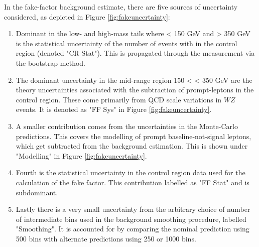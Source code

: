 In the fake-factor background estimate, there are five sources of uncertainty considered, as depicted in Figure \ref{fig:fakeuncertainty}: 
\begin{enumerate}
    \item Dominant in the low- and high-mass tails where \mFourL < 150 GeV and \mFourL > 350 GeV is the statistical uncertainty of the number of events with in the control region (denoted "CR Stat"). This is propagated through the measurement via the bootstrap method.
    \item The dominant uncertainty in the mid-range region 150 < \mFourL < 350 GeV are the theory uncertainties associated with the subtraction of prompt-leptons in the control region. These come primarily from QCD scale variations in $WZ$ events. It is denoted as "FF Sys" in Figure \ref{fig:fakeuncertainty}. 
    \item A smaller contribution comes from the uncertainties in the Monte-Carlo predictions. This covers the modelling of prompt baseline-not-signal leptons, which get subtracted from the background estimation. This is shown under "Modelling" in Figure \ref{fig:fakeuncertainty}. 
    \item Fourth is the statistical uncertainty in the control region data used for the calculation of the fake factor. This contribution labelled as "FF Stat" and is subdominant. 
    \item Lastly there is a very small uncertainty from the arbitrary choice of number of intermediate bins used in the background smoothing procedure, labelled "Smoothing". It is accounted for by comparing the nominal prediction using 500 bins with alternate predictions using 250 or 1000 bins. 
\end{enumerate}
